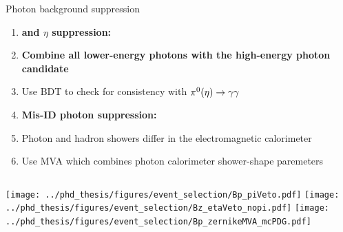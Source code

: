 \documentclass[xcolor=dvipsnames]{beamer}
\begin{document}
\begin{frame}{Photon background suppression}
   \centering\scriptsize
   \begin{enumerate}
      \item {\bf\large\piz and $\eta$ suppression:}\\
      \item[\ra] \textbf{Combine all lower-energy photons with the high-energy photon candidate}
      \item[\ra] Use BDT to check for consistency with $\pi^0(\eta)\rightarrow\gamma\gamma$\\
      \vspace{10pt}
      \item {\bf\large Mis-ID photon suppression:}\\
      \item[\ra] Photon and hadron showers differ in the electromagnetic calorimeter
      \item[\ra] Use MVA which combines photon calorimeter shower-shape paremeters 
  \end{enumerate}  
  \begin{columns}
   \texttt{[image: ../phd\_thesis/figures/event\_selection/Bp\_piVeto.pdf]}
   \texttt{[image: ../phd\_thesis/figures/event\_selection/Bz\_etaVeto\_nopi.pdf]}
   \texttt{[image: ../phd\_thesis/figures/event\_selection/Bp\_zernikeMVA\_mcPDG.pdf]}
\end{columns}


\end{frame}

\end{document}

